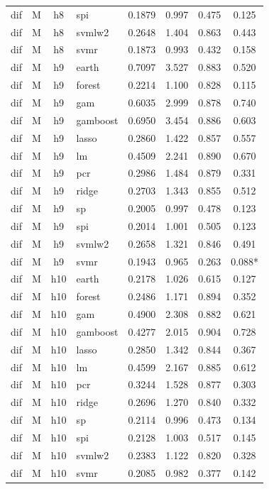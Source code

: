 \begin{ThreePartTable}
\begin{longtable}[t]{llclcccc}
dif & M & h8 & spi & 0.1879 & 0.997 & 0.475 & 0.125\\
dif & M & h8 & svmlw2 & 0.2648 & 1.404 & 0.863 & 0.443\\
dif & M & h8 & svmr & 0.1873 & 0.993 & 0.432 & 0.158\\
\addlinespace
dif & M & h9 & earth & 0.7097 & 3.527 & 0.883 & 0.520\\
dif & M & h9 & forest & 0.2214 & 1.100 & 0.828 & 0.115\\
dif & M & h9 & gam & 0.6035 & 2.999 & 0.878 & 0.740\\
dif & M & h9 & gamboost & 0.6950 & 3.454 & 0.886 & 0.603\\
dif & M & h9 & lasso & 0.2860 & 1.422 & 0.857 & 0.557\\
dif & M & h9 & lm & 0.4509 & 2.241 & 0.890 & 0.670\\
dif & M & h9 & pcr & 0.2986 & 1.484 & 0.879 & 0.331\\
dif & M & h9 & ridge & 0.2703 & 1.343 & 0.855 & 0.512\\
dif & M & h9 & sp & 0.2005 & 0.997 & 0.478 & 0.123\\
dif & M & h9 & spi & 0.2014 & 1.001 & 0.505 & 0.123\\
dif & M & h9 & svmlw2 & 0.2658 & 1.321 & 0.846 & 0.491\\
dif & M & h9 & svmr & 0.1943 & 0.965 & 0.263 & 0.088*\\
\addlinespace
dif & M & h10 & earth & 0.2178 & 1.026 & 0.615 & 0.127\\
dif & M & h10 & forest & 0.2486 & 1.171 & 0.894 & 0.352\\
dif & M & h10 & gam & 0.4900 & 2.308 & 0.882 & 0.621\\
dif & M & h10 & gamboost & 0.4277 & 2.015 & 0.904 & 0.728\\
dif & M & h10 & lasso & 0.2850 & 1.342 & 0.844 & 0.367\\
dif & M & h10 & lm & 0.4599 & 2.167 & 0.885 & 0.612\\
dif & M & h10 & pcr & 0.3244 & 1.528 & 0.877 & 0.303\\
dif & M & h10 & ridge & 0.2696 & 1.270 & 0.840 & 0.332\\
dif & M & h10 & sp & 0.2114 & 0.996 & 0.473 & 0.134\\
dif & M & h10 & spi & 0.2128 & 1.003 & 0.517 & 0.145\\
dif & M & h10 & svmlw2 & 0.2383 & 1.122 & 0.820 & 0.328\\
dif & M & h10 & svmr & 0.2085 & 0.982 & 0.377 & 0.142\\

\end{longtable}
\end{ThreePartTable}
